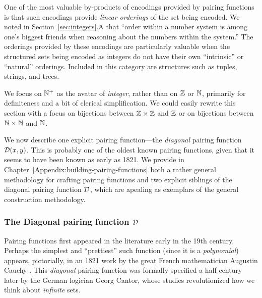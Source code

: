 One of the most valuable by-products of encodings provided by pairing
functions is that such encodings provide {\em linear orderings} of the
set being encoded.  We noted in Section~\ref{sec:integers}.A that
``order within a number system is among one's biggest friends when
reasoning about the numbers within the system.''  The orderings
provided by these encodings are particularly
valuable when the structured sets being encoded as integers do not
have their own ``intrinsic'' or ``natural'' orderings.  Included in
this category are  structures such as tuples,
strings, and trees.

\bigskip

\noindent {}
\bigskip

We focus on $\mathbb{N}^+$ as the avatar of {\it integer}, rather than on $\mathbb{Z}$
or $\mathbb{N}$, primarily for definiteness and a bit of clerical
simplification.  We could easily rewrite this section with a focus on
bijections between $\mathbb{Z} \times \mathbb{Z}$ and $\mathbb{Z}$ or on bijections between
$\mathbb{N} \times \mathbb{N}$ and $\mathbb{N}$.

\bigskip

We now describe one explicit pairing function---the {\em diagonal}
pairing function $\mbox{$\cal D$}(x,y)$.  This is probably one of the oldest known
pairing functions, given that it seems to have been known as early as
1821.  We provide in Chapter~\ref{Appendix:building-pairing-functions}
both a rather general methodology for crafting pairing functions and
two explicit siblings of the diagonal pairing function $\mbox{$\cal D$}$, which are
apealing as exemplars of the general construction methodology.

\subsubsection{The Diagonal pairing function $\mbox{$\cal D$}$}
\label{sec:diag-pair-fn}

Pairing functions first appeared in the literature early in the 19th
century.  Perhaps the simplest and ``prettiest'' such function (since
it is a {\em polynomial}) appears, pictorially, in an 1821 work by the
great French mathematician Augustin Cauchy \cite{Cauchy21}.
%
This {\em diagonal} pairing function was formally specified a
half-century later by the German logician Georg Cantor,
%
whose studies \cite{Cantor74,Cantor78} revolutionized how we think
about {\em infinite} sets.

